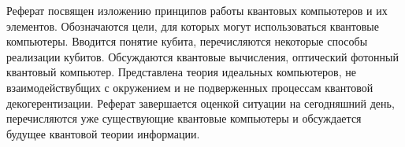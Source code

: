 \begin{center}
\footnotesize{Реферат посвящен изложению принципов работы квантовых компьютеров и их элементов.
Обозначаются цели, для которых могут использоваться квантовые компьютеры.
Вводится понятие кубита, перечисляются некоторые способы реализации кубитов. Обсуждаются квантовые вычисления, оптический фотонный квантовый компьютер.
Представлена теория идеальных компьютеров, не взаимодействубщих с окружением и не
подверженных процессам квантовой декогерентизации. Реферат завершается оценкой ситуации
на сегодняшний день, перечисляются уже существующие квантовые компьютеры и обсуждается
будущее квантовой теории информации.}
\end{center}